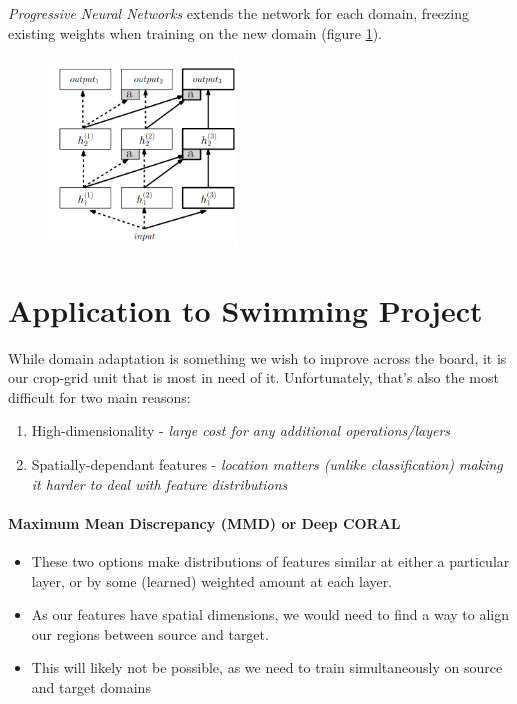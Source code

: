 \documentclass{report}
\begin{document}
\textit{Progressive Neural Networks}\parencite{progressivenets} extends the network for each domain, freezing existing weights when training on the new domain (figure \ref{fig:progressivenets}).
\begin{figure}[h]
	\centering
	\includegraphics[width=5cm]{imgs/progressivenets}
	\caption{}
	\label{fig:progressivenets}
\end{figure}

\chapter*{Application to Swimming Project}
While domain adaptation is something we wish to improve across the board, it is our crop-grid unit that is most in need of it. Unfortunately, that's also the most difficult for two main reasons:
\begin{enumerate}
	\item High-dimensionality - \textit{large cost for any additional operations/layers}
	\item Spatially-dependant features - \textit{location matters (unlike classification) making it harder to deal with feature distributions}
\end{enumerate}

\subsubsection{Maximum Mean Discrepancy (MMD) or Deep CORAL}
\begin{itemize}
	\item These two options make distributions of features similar at either a particular layer, or by some (learned) weighted amount at each layer.
	\item As our features have spatial dimensions, we would need to find a way to align our regions between source and target.
	\item This will likely not be possible, as we need to train simultaneously on source and target domains
\end{itemize}
\end{document}
